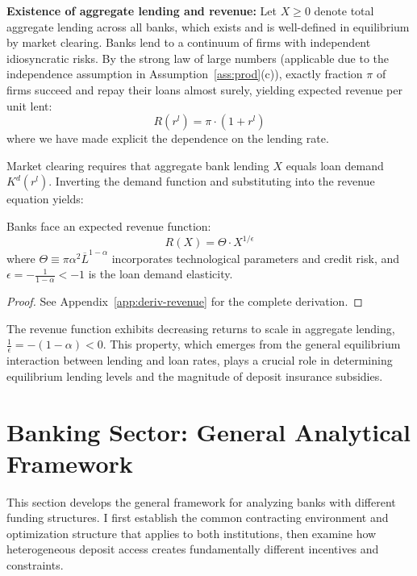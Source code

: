 \documentclass[12pt]{article}
\begin{document}
\textbf{Existence of aggregate lending and revenue:} Let $X \geq 0$ denote total aggregate lending across all banks, which exists and is well-defined in equilibrium by market clearing. Banks lend to a continuum of firms with independent idiosyncratic risks. By the strong law of large numbers (applicable due to the independence assumption in Assumption~\ref{ass:prod}(c)), exactly fraction $\pi$ of firms succeed and repay their loans almost surely, yielding expected revenue per unit lent:
\begin{equation}
    R(r^l) = \pi \cdot (1+r^{l})
\end{equation}
where we have made explicit the dependence on the lending rate.

Market clearing requires that aggregate bank lending $X$ equals loan demand $K^d(r^l)$. Inverting the demand function and substituting into the revenue equation yields:

\begin{proposition}
\label{prop:rev}
Banks face an expected revenue function:
\begin{equation}
    R(X) = \Theta \cdot X^{1/\epsilon}
\end{equation}
where $\Theta \equiv \pi\alpha^{2}\overline{L}^{1-\alpha}$ incorporates technological parameters and credit risk, and $\epsilon = -\frac{1}{1-\alpha} < -1$ is the loan demand elasticity.
\end{proposition}

\begin{proof}
See Appendix~\ref{app:deriv-revenue} for the complete derivation.
\end{proof}

The revenue function exhibits decreasing returns to scale in aggregate lending, $\frac{1}{\epsilon} = -(1-\alpha) < 0$. This property, which emerges from the general equilibrium interaction between lending and loan rates, plays a crucial role in determining equilibrium lending levels and the magnitude of deposit insurance subsidies.

\section{Banking Sector: General Analytical Framework}
This section develops the general framework for analyzing banks with different funding structures. I first establish the common contracting environment and optimization structure that applies to both institutions, then examine how heterogeneous deposit access creates fundamentally different incentives and constraints.
\end{document}

